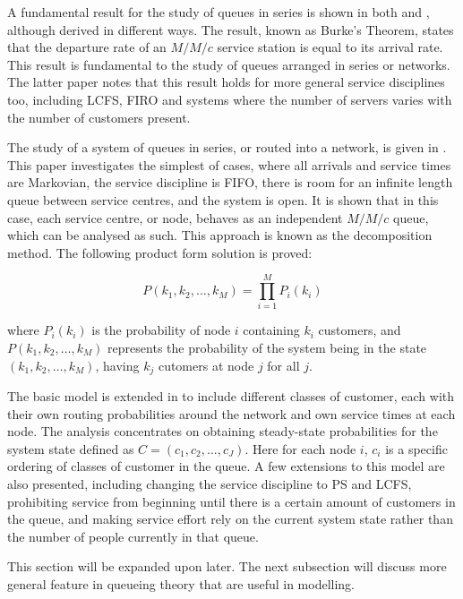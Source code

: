 \documentclass{article}
\begin{document}
A fundamental result for the study of queues in series is shown in both \cite{burke56} and \cite{reich57}, although derived in different ways.
The result, known as Burke's Theorem, states that the departure rate of an $M/M/c$ service station is equal to its arrival rate.
This result is fundamental to the study of queues arranged in series or networks.
The latter paper notes that this result holds for more general service disciplines too, including LCFS, FIRO and systems where the number of servers varies with the number of customers present.

The study of a system of queues in series, or routed into a network, is given in \cite{jackson57}.
This paper investigates the simplest of cases, where all arrivals and service times are Markovian, the service discipline is FIFO, there is room for an infinite length queue between service centres, and the system is open.
It is shown that in this case, each service centre, or node, behaves as an
independent $M/M/c$ queue, which can be analysed as such.
This approach is known as the decomposition method.
The following product form solution is proved:

\begin{equation}
    P(k_1, k_2, \dotsc, k_M) = \prod_{i=1}^M P_i(k_i)
\end{equation}

where $P_i(k_i)$ is the probability of node $i$ containing $k_i$ customers, and $P(k_1, k_2, \dotsc, k_M)$ represents the probability of the system being in the state $(k_1, k_2, \dotsc, k_M)$, having $k_j$ cutomers at node $j$ for all $j$.

The basic model is extended in \cite{kelly75} to include different classes of customer, each with their own routing probabilities around the network and own service times at each node.
The analysis concentrates on obtaining steady-state probabilities for the system state defined as $C = (c_1, c_2, ... , c_J)$.
Here for each node $i$, $c_i$ is a specific ordering of classes of customer in the queue.
A few extensions to this model are also presented, including changing the service discipline to PS and LCFS, prohibiting service from beginning until there is a certain amount of customers in the queue, and making service effort rely on the current system state rather than the number of people currently in that queue.

This section will be expanded upon later.
The next subsection will discuss more general feature in queueing theory that are useful in modelling.
\end{document}
